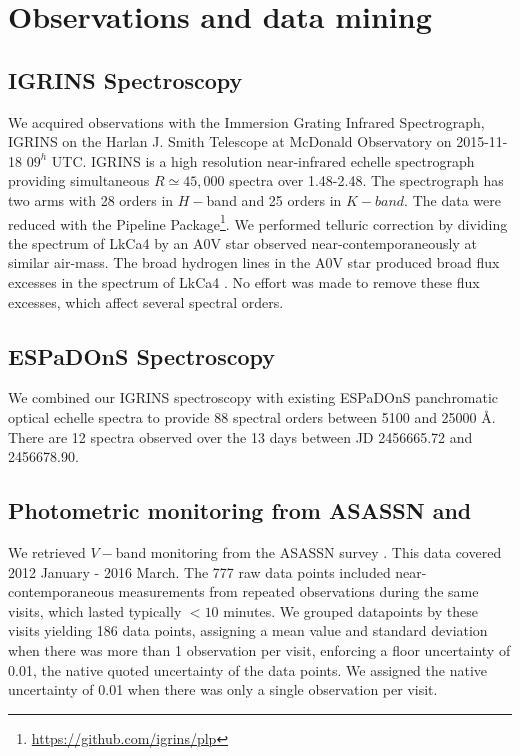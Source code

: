 \documentclass[onecolumn]{emulateapj}%
\newcommand{\name}{LkCa4 }
\begin{document}
\section{Observations and data mining}\label{sec:obs} 

\subsection{IGRINS Spectroscopy}\label{sec:igrins} 
We acquired observations with the Immersion Grating Infrared Spectrograph, IGRINS \citep{2014SPIE.9147E..1DP,2012SPIE.8450E..2SG} on the Harlan J. Smith Telescope at McDonald Observatory on 2015-11-18 $09^h$ UTC.  IGRINS is a high resolution near-infrared echelle spectrograph providing simultaneous $R\simeq45,000$ spectra over 1.48-2.48\um.  The spectrograph has two arms with 28 orders in $H-$band and 25 orders in $K-band$.  The data were reduced with the Pipeline Package\footnote{\url{https://github.com/igrins/plp}}.  We performed telluric correction by dividing the spectrum of \name by an A0V star observed near-contemporaneously at similar air-mass.  The broad hydrogen lines in the A0V star produced broad flux excesses in the spectrum of \name.  No effort was made to remove these flux excesses, which affect several spectral orders. 

\subsection{ESPaDOnS Spectroscopy}
We combined our IGRINS spectroscopy with existing ESPaDOnS panchromatic optical echelle spectra to provide 88 spectral orders between 5100 and 25000 \AA \citep{2014MNRAS.444.3220D}.  There are 12 spectra observed over the 13 days between JD 2456665.72 and 2456678.90.  

\subsection{Photometric monitoring from ASASSN and \citet{grankin08}}

We retrieved $V-$band monitoring from the ASASSN survey \citep{2014ApJ...788...48S}.  This data covered 2012 January - 2016 March.  The 777 raw data points included near-contemporaneous measurements from repeated observations during the same visits, which lasted typically $<10$ minutes.  We grouped datapoints by these visits yielding 186 data points, assigning a mean value and standard deviation when there was more than 1 observation per visit, enforcing a floor uncertainty of 0.01, the native quoted uncertainty of the data points.  We assigned the native uncertainty of 0.01 when there was only a single observation per visit.
\end{document}
